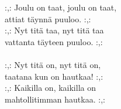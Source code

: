 
            :,: Joulu on taat, joulu on taat, \\
            attiat täynnä puuloo. :,: \\
            :,: Nyt titä taa, nyt titä taa \\
            vattanta täyteen puuloo. :,: \\
\hspace{10mm} \\
            :,: Nyt titä on, nyt titä on, \\
            taatana kun on hautkaa! :,: \\
            :,: Kaikilla on, kaikilla on \\
            mahtollitimman hautkaa. :,: \\
